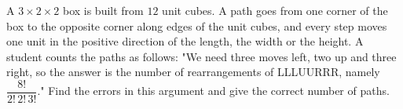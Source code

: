 A $3\times2\times2$ box is built from $12$ unit cubes. A path goes from one corner of the box to the opposite corner along edges of the unit cubes, and every step moves one unit in the positive direction of the length, the width or the height. A student counts the paths as follows: "We need three moves left, two up and three right, so the answer is the number of rearrangements of LLLUURRR, namely $\dfrac{8!}{2!\,2!\,3!}$." Find the errors in this argument and give the correct number of paths.
